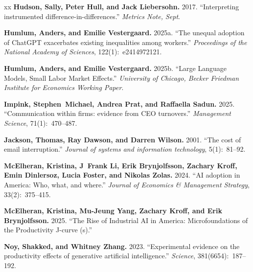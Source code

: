 \documentclass{article}
\begin{document}
\begin{thebibliography}{xx}
{\bf Hudson, Sally, Peter Hull, and Jack Liebersohn.} 2017. ``Interpreting instrumented difference-in-differences.'' {\em Metrics Note, Sept}.

{\bf Humlum, Anders, and Emilie Vestergaard.} 2025a. ``The unequal adoption of ChatGPT exacerbates existing inequalities among workers.'' {\em Proceedings of the National Academy of Sciences}, 122(1):~e2414972121.

{\bf Humlum, Anders, and Emilie Vestergaard.} 2025b. ``Large Language Models, Small Labor Market Effects.'' {\em University of Chicago, Becker Friedman Institute for Economics Working Paper}.

{\bf Impink, Stephen~Michael, Andrea Prat, and Raffaella Sadun.} 2025. ``Communication within firms: evidence from CEO turnovers.'' {\em Management Science}, 71(1):~470--487.

{\bf Jackson, Thomas, Ray Dawson, and Darren Wilson.} 2001. ``The cost of email interruption.'' {\em Journal of systems and information technology}, 5(1):~81--92.

{\bf McElheran, Kristina, J~Frank Li, Erik Brynjolfsson, Zachary Kroff, Emin Dinlersoz, Lucia Foster, and Nikolas Zolas.} 2024. ``AI adoption in America: Who, what, and where.'' {\em Journal of Economics \& Management Strategy}, 33(2):~375--415.

{\bf McElheran, Kristina, Mu-Jeung Yang, Zachary Kroff, and Erik Brynjolfsson.} 2025. ``The Rise of Industrial AI in America: Microfoundations of the Productivity J-curve (s).''

{\bf Noy, Shakked, and Whitney Zhang.} 2023. ``Experimental evidence on the productivity effects of generative artificial intelligence.'' {\em Science}, 381(6654):~187--192.


\end{thebibliography}
\end{document}
